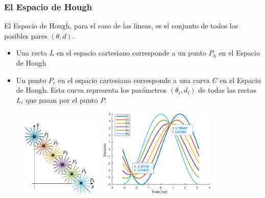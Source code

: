 \begin{frame}\frametitle{El Espacio de Hough}
  El Espacio de Hough, para el caso de las líneas, es el conjunto de todos los posibles pares $(\theta, d)$.
  \begin{itemize}
  \item Una recta $L$ en el espacio cartesiano corresponde a un punto $P_h$ en el Espacio de Hough
  \item Un punto $P_c$ en el espacio cartesiano corresponde a una curva $C$ en el Espacio de Hough. Esta curva representa los parámetros $(\theta_i, d_i)$ de todas las rectas $L_i$ que pasan por el punto $P$.
  \end{itemize}
  \begin{figure}
    \centering
    \includegraphics[width=0.35\textwidth]{Figures/Hough1.pdf}
    \includegraphics[width=0.5\textwidth]{Figures/Hough1.eps}
  \end{figure}
\end{frame}

